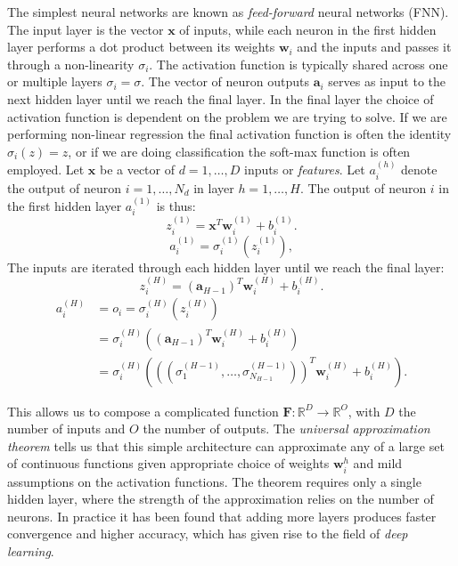 The simplest neural networks are known as \textit{feed-forward} neural networks (FNN).
The input layer is the vector $\bm{x}$ of inputs, while each neuron in the first
hidden layer performs a dot product between its weights $\bm{w}_i$ and the inputs
and passes it through a non-linearity $\sigma_i$. The activation function
is typically shared across one or multiple layers $\sigma_i = \sigma$. The vector of neuron outputs
$\bm{a}_i$ serves as input to the next hidden layer until we reach the final layer.
In the final layer the choice of activation function is dependent on the problem
we are trying to solve. If we are performing non-linear regression the
final activation function is often the identity $\sigma_i(z) = z$, or if
we are doing classification the soft-max function is often employed.
\newpage
Let $\bm{x}$ be a vector of $d = 1,\dots,D$ inputs or \textit{features}. Let $a_i^{(h)}$
denote the output of neuron $i = 1,\dots,N_d$ in layer $h = 1,\dots,H$.
The output of neuron $i$ in the first hidden layer $a_i^{(1)}$ is thus:
$$ z_i^{(1)} = \bm{x}^T \bm{w}_i^{(1)} + b_i^{(1)} .$$
$$ a_i^{(1)} = \sigma_i^{(1)}(z_i^{(1)}), $$
The inputs are iterated through each hidden layer until we reach the final layer:
$$ z_i^{(H)} = (\bm{a}_{H-1})^T \bm{w}_i^{(H)} + b_i^{(H)} .$$
\begin{equation}
\begin{split}
    a_i^{(H)} &= o_i = \sigma_i^{(H)}(z_i^{(H)}) \\
    &= \sigma_i^{(H)} \left((\bm{a}_{H-1})^T \bm{w}_i^{(H)} + b_i^{(H)} \right) \\
    &= \sigma_i^{(H)} \left(
    \left( (\sigma_1^{(H-1)},\dots,\sigma_{N_{H-1}}^{(H-1)}) \right)^T
    \bm{w}_i^{(H)} + b_i^{(H)} \right) .
\end{split}
\end{equation}

This allows us to compose a complicated function $\bm{F}: \mathbb{R}^D \rightarrow
\mathbb{R}^O$, with $D$ the number of inputs and $O$ the number of outputs.
The \textit{universal approximation theorem} tells us that this simple architecture
can approximate any of a large set of continuous functions
given appropriate choice of weights $\bm{w}_i^h$ and mild assumptions
on the activation functions. The theorem requires only a single hidden layer,
where the strength of the approximation relies on the number of neurons.
In practice it has been found that adding more layers produces
faster convergence and higher accuracy, which has given rise
to the field of \textit{deep learning}.

